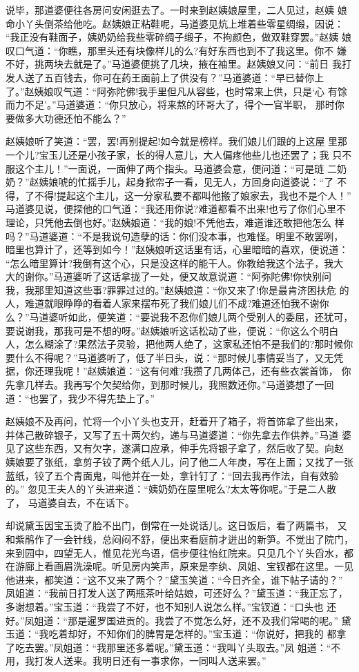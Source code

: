 说毕，那道婆便往各房问安闲逛去了。一时来到赵姨娘屋里，二人见过，赵姨
娘命小丫头倒茶给他吃。赵姨娘正粘鞋呢，马道婆见炕上堆着些零星绸缎，因说：
“我正没有鞋面子，姨奶奶给我些零碎绸子缎子，不拘颜色，做双鞋穿罢。”赵姨
娘叹口气道：“你瞧，那里头还有块像样儿的么?有好东西也到不了我这里。你不
嫌不好，挑两块去就是了。”马道婆便挑了几块，掖在袖里。赵姨娘又问：“前日
我打发人送了五百钱去，你可在药王面前上了供没有？”马道婆道：“早已替你上
了。”赵姨娘叹气道：“阿弥陀佛!我手里但凡从容些，也时常来上供，只是‘心
有馀而力不足’。”马道婆道：“你只放心，将来熬的环哥大了，得个一官半职，
那时你要做多大功德还怕不能么？”

赵姨娘听了笑道：“罢，罢!再别提起!如今就是榜样。我们娘儿们跟的上这屋
里那一个儿?宝玉儿还是小孩子家，长的得人意儿，大人偏疼他些儿也还罢了；我
只不服这个主儿！”一面说，一面伸了两个指头。马道婆会意，便问道：“可是琏
二奶奶？”赵姨娘唬的忙摇手儿，起身掀帘子一看，见无人，方回身向道婆说：“了
不得，了不得!提起这个主儿，这一分家私要不都叫他搬了娘家去，我也不是个人！”
马道婆见说，便探他的口气道：“我还用你说?难道都看不出来!也亏了你们心里不
理论，只凭他去倒也好。”赵姨娘道：“我的娘!不凭他去，难道谁还敢把他怎么
样吗？”马道婆道：“不是我说句造孽的话：你们没本事，也难怪。明里不敢罢咧，
暗里也算计了，还等到如今！”赵姨娘听这话里有话，心里暗暗的喜欢，便说道：
“怎么暗里算计?我倒有这个心，只是没这样的能干人。你教给我这个法子，我大
大的谢你。”马道婆听了这话拿拢了一处，便又故意说道：“阿弥陀佛!你快别问
我，我那里知道这些事?罪罪过过的。”赵姨娘道：“你又来了!你是最肯济困扶危
的人，难道就眼睁睁的看着人家来摆布死了我们娘儿们不成?难道还怕我不谢你
么？”马道婆听如此，便笑道：“要说我不忍你们娘儿两个受别人的委屈，还犹可，
要说谢我，那我可是不想的呀。”赵姨娘听这话松动了些，便说：“你这么个明白
人，怎么糊涂了?果然法子灵验，把他两人绝了，这家私还怕不是我们的?那时候你
要什么不得呢？”马道婆听了，低了半日头，说：“那时候儿事情妥当了，又无凭
据，你还理我呢！”赵姨娘道：“这有何难?我攒了几两体己，还有些衣裳首饰，
你先拿几样去。我再写个欠契给你，到那时候儿，我照数还你。”马道婆想了一回
道：“也罢了，我少不得先垫上了。”

赵姨娘不及再问，忙将一个小丫头也支开，赶着开了箱子，将首饰拿了些出来，
并体己散碎银子，又写了五十两欠约，递与马道婆道：“你先拿去作供养。”马道
婆见了这些东西，又有欠字，遂满口应承，伸手先将银子拿了，然后收了契。向赵
姨娘要了张纸，拿剪子铰了两个纸人儿，问了他二人年庚，写在上面；又找了一张
蓝纸，铰了五个青面鬼，叫他并在一处，拿针钉了：“回去我再作法，自有效验的。”
忽见王夫人的丫头进来道：“姨奶奶在屋里呢么?太太等你呢。”于是二人散了，
马道婆自去，不在话下。

却说黛玉因宝玉烫了脸不出门，倒常在一处说话儿。这日饭后，看了两篇书，
又和紫鹃作了一会针线，总闷闷不舒，便出来看庭前才迸出的新笋。不觉出了院门，
来到园中，四望无人，惟见花光鸟语，信步便往怡红院来。只见几个丫头舀水，都
在游廊上看画眉洗澡呢。听见房内笑声，原来是李纨、凤姐、宝钗都在这里。一见
他进来，都笑道：“这不又来了两个？”黛玉笑道：“今日齐全，谁下帖子请的？”
凤姐道：“我前日打发人送了两瓶茶叶给姑娘，可还好么？”黛玉道：“我正忘了，
多谢想着。”宝玉道：“我尝了不好，也不知别人说怎么样。”宝钗道：“口头也
还好。”凤姐道：“那是暹罗国进贡的。我尝了不觉怎么好，还不及我们常喝的呢。”
黛玉道：“我吃着却好，不知你们的脾胃是怎样的。”宝玉道：“你说好，把我的
都拿了吃去罢。”凤姐道：“我那里还多着呢。”黛玉道：“我叫丫头取去。”凤
姐道：“不用，我打发人送来。我明日还有一事求你，一同叫人送来罢。”

